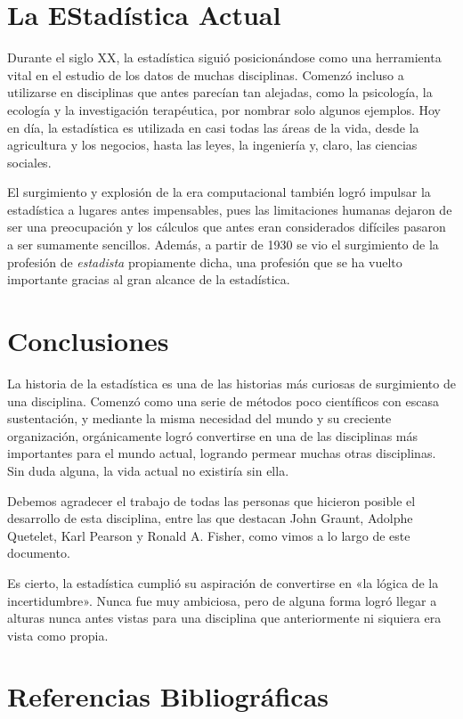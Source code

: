 \documentclass[12pt, a4paper]{article}
\begin{document}
\section{La EStadística Actual}

Durante el siglo XX, la estadística siguió posicionándose como una herramienta vital en el estudio de los datos de muchas disciplinas. Comenzó incluso a utilizarse en disciplinas que antes parecían tan alejadas, como la psicología, la ecología y la investigación terapéutica, por nombrar solo algunos ejemplos.  Hoy en día, la estadística es utilizada en casi todas las áreas de la vida, desde la agricultura y los negocios, hasta las leyes, la ingeniería y, claro, las ciencias sociales.

El surgimiento y explosión de la era computacional también logró impulsar la estadística a lugares antes impensables, pues las limitaciones humanas dejaron de ser una preocupación y los cálculos que antes eran considerados difíciles pasaron a ser sumamente sencillos. Además, a partir de 1930 se vio el surgimiento de la profesión de \textit{estadista} propiamente dicha, una profesión que se ha vuelto importante gracias al gran alcance de la estadística.

\section{Conclusiones}

La historia de la estadística es una de las historias más curiosas de surgimiento de una disciplina. Comenzó como una serie de métodos poco científicos con escasa sustentación, y mediante la misma necesidad del mundo y su creciente organización, orgánicamente logró convertirse en una de las disciplinas más importantes para el mundo actual, logrando permear muchas otras disciplinas. Sin duda alguna, la vida actual no existiría sin ella.

Debemos agradecer el trabajo de todas las personas que hicieron posible el desarrollo de esta disciplina, entre las que destacan John Graunt, Adolphe Quetelet, Karl Pearson y Ronald A. Fisher, como vimos a lo largo de este documento.

Es cierto, la estadística cumplió su aspiración de convertirse en «la lógica de la incertidumbre». Nunca fue muy ambiciosa, pero de alguna forma logró llegar a alturas nunca antes vistas para una disciplina que anteriormente ni siquiera era vista como propia.

\newpage

\section{Referencias Bibliográficas}
\end{document}
